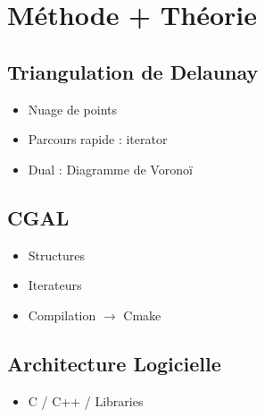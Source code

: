 \chapter{Méthode + Théorie}

\section{Triangulation de Delaunay}
\begin{itemize}
  \item Nuage de points
  \item Parcours rapide : iterator
  \item Dual : Diagramme de Voronoï
\end{itemize}

\section{CGAL}
\begin{itemize}
  \item Structures
  \item Iterateurs
  \item Compilation $\to$ Cmake
\end{itemize}

\section{Architecture Logicielle}
\begin{itemize}
  \item C / C++ / Libraries
\end{itemize}
